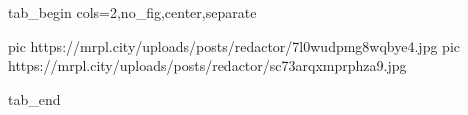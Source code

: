  
 
 
 
 

\ifcmt
  tab_begin cols=2,no_fig,center,separate

     pic https://mrpl.city/uploads/posts/redactor/7l0wudpmg8wqbye4.jpg
		 pic https://mrpl.city/uploads/posts/redactor/sc73arqxmprphza9.jpg

  tab_end
\fi
